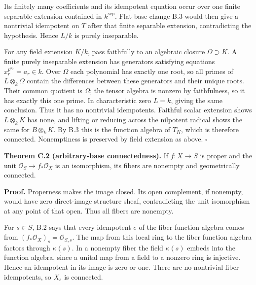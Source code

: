 \documentclass[11pt]{article}
\begin{document}
Its finitely many coefficients and its idempotent equation occur over
one finite separable extension contained in \(k^{\mathrm{sep}}\). Flat
base change B.3 would then give a nontrivial idempotent on \(T\) after
that finite separable extension, contradicting the hypothesis. Hence
\(L/k\) is purely inseparable.

For any field extension \(K/k\), pass faithfully to an algebraic closure
\(\Omega\supset K\). A finite purely inseparable extension has
generators satisfying equations \(x_r^{p^{n_r}}=a_r\in k\). Over
\(\Omega\) each polynomial has exactly one root, so all primes of
\(L\otimes_k\Omega\) contain the differences between these generators
and their unique roots. Their common quotient is \(\Omega\); the tensor
algebra is nonzero by faithfulness, so it has exactly this one prime. In
characteristic zero \(L=k\), giving the same conclusion. Thus it has no
nontrivial idempotents. Faithful scalar extension shows \(L\otimes_k K\)
has none, and lifting or reducing across the nilpotent radical shows the
same for \(B\otimes_k K\). By B.3 this is the function algebra of
\(T_K\), which is therefore connected. Nonemptiness is preserved by
field extension as above. \(\square\)

\textbf{Theorem C.2 (arbitrary-base connectedness).} If \(f:X\to S\) is
proper and the unit \(\mathcal O_S\to f_*\mathcal O_X\) is an
isomorphism, its fibers are nonempty and geometrically connected.

\textbf{Proof.} Properness makes the image closed. Its open complement,
if nonempty, would have zero direct-image structure sheaf, contradicting
the unit isomorphism at any point of that open. Thus all fibers are
nonempty.

For \(s\in S\), B.2 says that every idempotent \(e\) of the fiber
function algebra comes from \((f_*\mathcal O_X)_s=\mathcal O_{S,s}\).
The map from this local ring to the fiber function algebra factors
through \(\kappa(s)\). In a nonempty fiber the field \(\kappa(s)\)
embeds into the function algebra, since a unital map from a field to a
nonzero ring is injective. Hence an idempotent in its image is zero or
one. There are no nontrivial fiber idempotents, so \(X_s\) is connected.
\end{document}
